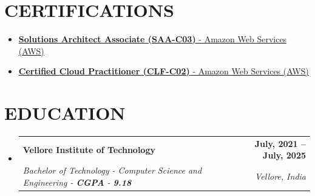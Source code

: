 \documentclass[letterpaper,11pt]{article}
\makeatletter
\newcommand{\resumeItem}[1]{
  \item\small{
    {#1 \vspace{-1pt}}
  }
}
\newcommand{\resumeSubheading}[4]{
  \vspace{-1pt}\item
    \begin{tabular*}{1.0\textwidth}[t]{l@{\extracolsep{\fill}}r}
      \textbf{\large#1} & \textbf{\small #2} \\
      \textit{\large#3} & \textit{\small #4} \\
      
    \end{tabular*}\vspace{-7pt}
}
\newcommand{\resumeSubHeadingListStart}{\begin{itemize}[leftmargin=0.0in, label={}]}
\newcommand{\resumeSubHeadingListEnd}{\end{itemize}}
\newcommand{\resumeItemListStart}{\begin{itemize}}
\newcommand{\resumeItemListEnd}{\end{itemize}\vspace{-5pt}}
\makeatother
\begin{document}
\section{CERTIFICATIONS}
    \vspace{2.5pt}
    \resumeItemListStart 
        \resumeItem{\normalsize{\href{https://www.credly.com/badges/dc22fd53-b367-4c97-b2ef-066a59371946/public_url}{\textbf{Solutions Architect Associate (SAA-C03)} - Amazon Web Services (AWS) \footnotesize{\raisebox{-0.1\height}\faExternalLink}}}} \vspace{-5pt}
        \resumeItem{\normalsize{\href{https://www.credly.com/badges/d0f572c3-7d2c-416c-803d-4963611704f5/public_url}{\textbf{Certified Cloud Practitioner (CLF-C02)} - Amazon Web Services (AWS) \footnotesize{\raisebox{-0.1\height}\faExternalLink}}}} \vspace{-5pt}
    \resumeItemListEnd
    \vspace{-7.5pt}



\section{EDUCATION} 
    \vspace{2.5pt}
    \resumeSubHeadingListStart

        \resumeSubheading
            {Vellore Institute of Technology}{July, 2021 -- July, 2025}
            {Bachelor of Technology - Computer Science and Engineering - \textbf{CGPA} - \textbf{9.18}}{Vellore, India}
            \vspace{-1pt}


    \resumeSubHeadingListEnd
    \vspace{-12.5pt}
    
\end{document}
